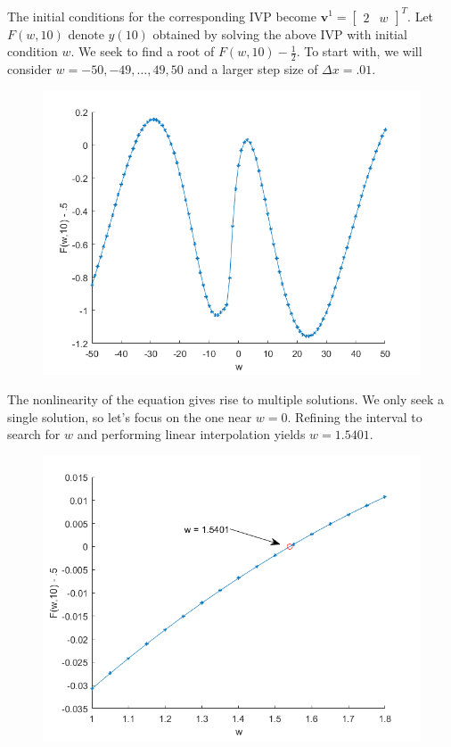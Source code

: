 \documentclass[]{article}
\theoremstyle{definition}
\numberwithin{equation}{section}
\begin{document}
The initial conditions for the corresponding IVP become $\mathbf{v}^1 = \begin{bmatrix}
2 & w
\end{bmatrix}^T.$ Let $F(w,10)$ denote $y(10)$ obtained by solving the above IVP with initial condition $w$. We seek to find a root of $F(w,10) - \frac{1}{2}$. To start with, we will consider $ w = -50, -49, \dots, 49, 50$ and a larger step size of $\Delta x = .01$.
	\begin{figure}[H]
	\centering
	\includegraphics[scale=.7]{ex10_1_fig.png} 
	\label{fig:ex10_1}
\end{figure}

The nonlinearity of the equation gives rise to multiple solutions. We only seek a single solution, so let's focus on the one near $w = 0$. Refining the interval to search for $w$ and performing linear interpolation yields $w = 1.5401$.
	\begin{figure}[H]
	\centering
	\includegraphics[scale=.7]{ex10_2_fig.png} 
	\label{fig:ex10_2}
\end{figure}
\end{document}
